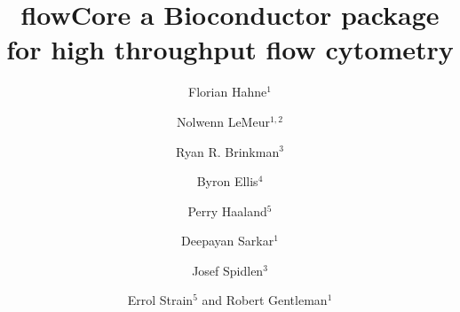 \documentclass[10pt]{bmc_article}
\newenvironment{bmcformat}{\begin{raggedright}\baselineskip20pt\sloppy\setboolean{publ}{false}}{\end{raggedright}\baselineskip20pt\sloppy}
\begin{document}
\begin{bmcformat}



\title{flowCore a Bioconductor package for high throughput flow cytometry}
 


\author{Florian Hahne\correspondingauthor$^1$%
      \and
         Nolwenn LeMeur\correspondingauthor$^{1,2}$%
       \and 
         Ryan R. Brinkman$^3$%
        \and
          Byron Ellis$^4$%
        \and
          Perry Haaland$^5$%
        \and
          Deepayan Sarkar$^1$%
        \and
         Josef Spidlen$^3$%
        \and
         Errol Strain$^5$%
       and
          Robert Gentleman$^1$%
        }
      

\address{%
  \iid(1)Life Sciences Department, Computational Biology Program,%
  Division of Public Health Sciences, Fred Hutchinson Cancer Research Center,%
  1100 Fairview Ave. N, M2-B876, PO Box 19024,  Seattle, Washington 98109-1024, USA\\
  \iid(2)EA SeRAIC INSERM, IRISA - Symbiose, Campus Beaulieu, Universit\'{e} de Rennes I, %
  35042 Rennes Cedex, France \\
  \iid(3)Terry Fox Laboratory, British Columbia Cancer Agency Research Centre,%
  675 West 10th Avenue, Vancouver, BC V5Z 1L3  Canada, Canada\\
  \iid(4)AdBrite Inc., 731 Market St., 5th Floor, San Francisco, California 94103, USA\\
  \iid(5)BD Biosciences, Research Triangle Park, North Carolina 27709, USA
}%
\maketitle


\end{bmcformat}
\end{document}
